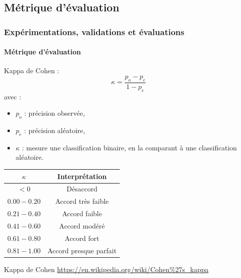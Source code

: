 \documentclass{beamer}
\begin{document}
		\subsection{Métrique d'évaluation}
			\begin{frame}
				\frametitle{Expérimentations, validations et évaluations}
				\framesubtitle{Métrique d'évaluation}
				\small
				\vspace{-5pt}
				Kappa de Cohen :
				\vspace{-5pt}
				\begin{equation*}
					\kappa = \frac{p_o - p_e}{1 - p_e}
				\end{equation*}
				\vspace{-5pt}
				avec :
				\begin{itemize}
					\item $p_o$ : précision observée,
					\item $p_e$ : précision aléatoire,
					\item $\kappa$ : mesure une classification binaire, en la comparant à une classification aléatoire.
				\end{itemize}
				\vspace{-15pt}
				\begin{table}
					\centering
					\begin{tabular}{|c|c|}
						\hline
						$\kappa$ & Interprétation \\
						\hline
						$< 0$ & Désaccord \\
						\hline
						$0.00 - 0.20$ & Accord très faible \\
						\hline
						$0.21 - 0.40$ & Accord faible \\
						\hline
						$0.41 - 0.60$ & Accord modéré \\
						\hline
						$0.61 - 0.80$ & Accord fort \\
						\hline
						$0.81 - 1.00$ & Accord presque parfait \\
						\hline
					\end{tabular}
				\end{table}
				Kappa de Cohen \url{https://en.wikipedia.org/wiki/Cohen\%27s_kappa}
			\end{frame}
\end{document}
